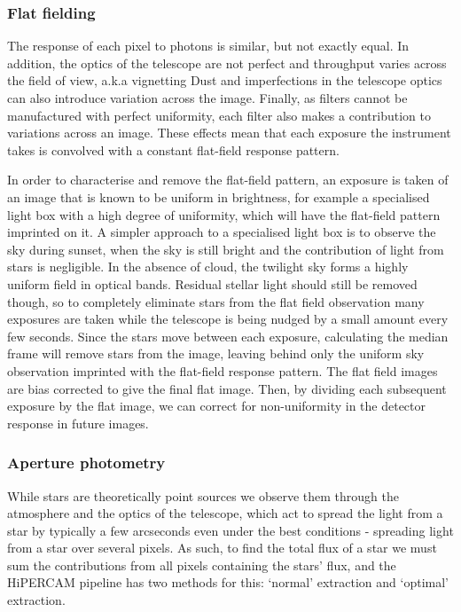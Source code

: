 \subsubsection{Flat fielding}
\label{sect:observations:flat field frames}

The response of each pixel to photons is similar, but not exactly equal. In addition, the optics of the telescope are not perfect and throughput varies across the field of view, a.k.a vignetting Dust and imperfections in the telescope optics can also introduce variation across the image. Finally, as filters cannot be manufactured with perfect uniformity, each filter also makes a contribution to variations across an image.
These effects mean that each exposure the instrument takes is convolved with a constant flat-field response pattern.

In order to characterise and remove the flat-field pattern, an exposure is taken of an image that is known to be uniform in brightness, for example a specialised light box with a high degree of uniformity, which will have the flat-field pattern imprinted on it.
A simpler approach to a specialised light box is to observe the sky during sunset, when the sky is still bright and the contribution of light from stars is negligible. In the absence of cloud, the twilight sky forms a highly uniform field in optical bands.
Residual stellar light should still be removed though, so to completely eliminate stars from the flat field observation many exposures are taken while the telescope is being nudged by a small amount every few seconds. Since the stars move between each exposure, calculating the median frame will remove stars from the image, leaving behind only the uniform sky observation imprinted with the flat-field response pattern.
The flat field images are bias corrected to give the final flat image.
Then, by dividing each subsequent exposure by the flat image, we can correct for non-uniformity in the detector response in future images.


\subsubsection{Aperture photometry}
\label{sect:observations:aperture photometry}

While stars are theoretically point sources we observe them through the atmosphere and the optics of the telescope, which act to spread the light from a star by typically a few arcseconds even under the best conditions - spreading light from a star over several pixels. As such, to find the total flux of a star we must sum the contributions from all pixels containing the stars' flux, and the HiPERCAM pipeline has two methods for this: `normal' extraction and `optimal' extraction.


